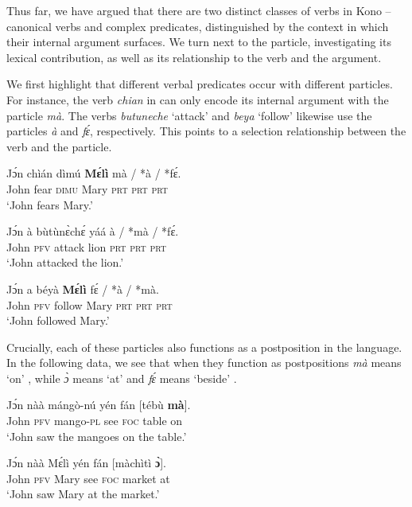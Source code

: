 \documentclass[output=paper,colorlinks,citecolor=brown,draftmode
]{langscibook}
\begin{document}
Thus far, we have argued that there are two distinct classes of verbs in Kono – canonical verbs and complex predicates, distinguished by the context in which their internal argument surfaces. We turn next to the particle, investigating its lexical contribution, as well as its relationship to the verb and the argument. 

We first highlight that different verbal predicates occur with different particles. For instance, the verb \textit{chian} in  can only encode its internal argument with the particle \textit{mà}. The verbs \textit{butuneche} ‘attack’  and \textit{beya} ‘follow’  likewise use the particles \textit{à} and \textit{fɛ́}, respectively. This points to a selection relationship between the verb and the particle. 

\ea \label{ex:Kono:PV fear ma} 
\gll Jɔ́n chìán dìmú \textbf{Mɛ́lì} mà	/ *à / *fɛ́. \\
John fear \textsc{dimu} Mary \textsc{prt} {} \textsc{prt} {} \textsc{prt} \\
\glt `John fears Mary.'
\z

\ea \label{ex:Kono:PV attack a}
\gll Jɔ́n à bùtùnɛ̀chɛ́ yáá à	/ *mà / *fɛ́. \\
John \textsc{pfv} attack lion \textsc{prt} {} \textsc{prt} {} \textsc{prt} \\
\glt `John attacked the lion.'
\z

\ea \label{ex: Kono:PV follow fɛ}
\gll Jɔ́n a béyà \textbf{Mɛ́lì} fɛ́ 	/ *à  / *mà. \\
John \textsc{pfv} follow Mary \textsc{prt} {} \textsc{prt} {} \textsc{prt} \\
\glt `John followed Mary.'
\z


Crucially, each of these particles also functions as a postposition in the language. In the following data, we see that when they function as postpositions \textit{mà} means ‘on’ , while \textit{ɔ̀} means `at'   and \textit{fɛ́} means ‘beside’ .

\ea \label{ex: Kono: Postpo ma}
\gll Jɔ́n nàà mángò-nú yén fán 	[tébù 	\textbf{mà}]. \\
John \textsc{pfv} mango-\textsc{pl} see \textsc{foc} table on \\
\glt `John  saw the mangoes on the table.'
\z

\ea \label{ex: Kono: Postpo a}
\gll Jɔ́n nàà Mɛ́lì yén fán [màchìtì \textbf{ɔ̀}]. \\
John \textsc{pfv} Mary see \textsc{foc} market at \\
\glt `John saw Mary at the market.'
\z
\end{document}
